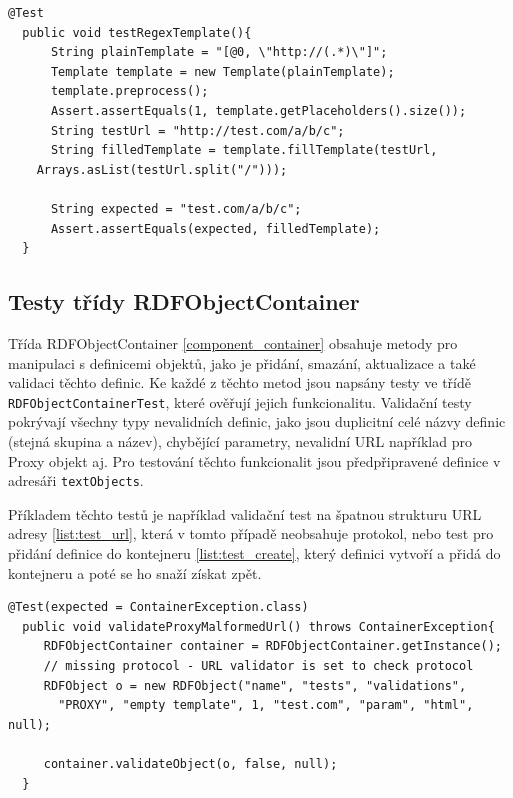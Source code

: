 \documentclass[thesis=B,czech]{FITthesis}[2012/06/26]
\begin{document}
  \begin{lstlisting}[float=htb,caption={Unit test na vyplnění placeholderu v šabloně s regulárním výrazem},label=list:test_template]
  @Test
  public void testRegexTemplate(){
      String plainTemplate = "[@0, \"http://(.*)\"]";
      Template template = new Template(plainTemplate);
      template.preprocess();
      Assert.assertEquals(1, template.getPlaceholders().size());
      String testUrl = "http://test.com/a/b/c";
      String filledTemplate = template.fillTemplate(testUrl,
	Arrays.asList(testUrl.split("/")));

      String expected = "test.com/a/b/c";
      Assert.assertEquals(expected, filledTemplate);
  }
\end{lstlisting}
  
  \subsection{Testy třídy RDFObjectContainer}
  Třída RDFObjectContainer \ref{component_container} obsahuje metody pro manipulaci s definicemi objektů, jako je přidání, smazání,
  aktualizace a také validaci těchto definic.
  Ke každé z těchto metod jsou napsány testy ve třídě\\
  \texttt{RDFObjectContainerTest}, které ověřují jejich funkcionalitu. Validační testy pokrývají všechny typy nevalidních definic, jako jsou duplicitní
  celé názvy definic (stejná skupina a název), chybějící parametry, nevalidní URL například pro Proxy objekt aj.  
  Pro testování těchto funkcionalit jsou předpřipravené definice v adresáři \texttt{textObjects}.
  
  Příkladem těchto testů je například validační test na špatnou strukturu URL adresy \ref{list:test_url}, která v tomto případě neobsahuje protokol, nebo test
  pro přidání definice do kontejneru \ref{list:test_create}, který definici vytvoří a přidá do kontejneru a poté se ho snaží získat zpět.
  
    \begin{lstlisting}[float=htb,caption={Unit test třídy RDFObjectContainer: Malformed URL},label=list:test_url]
  @Test(expected = ContainerException.class)
  public void validateProxyMalformedUrl() throws ContainerException{
     RDFObjectContainer container = RDFObjectContainer.getInstance();
     // missing protocol - URL validator is set to check protocol
     RDFObject o = new RDFObject("name", "tests", "validations",
       "PROXY", "empty template", 1, "test.com", "param", "html", null);

     container.validateObject(o, false, null);
  }
    
\end{lstlisting}
\end{document}
